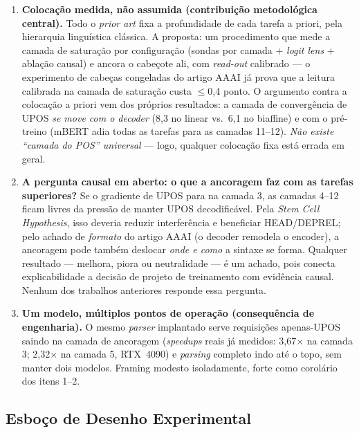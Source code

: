\begin{enumerate}
  \item \textbf{Colocação medida, não assumida (contribuição metodológica central).} Todo o
        \textit{prior art} fixa a profundidade de cada tarefa a priori, pela hierarquia
        linguística clássica. A proposta: um procedimento que mede a camada de saturação por
        configuração (sondas por camada + \textit{logit lens} + ablação causal) e ancora o
        cabeçote ali, com \textit{read-out} calibrado --- o experimento de cabeças congeladas
        do artigo AAAI já prova que a leitura calibrada na camada de saturação custa
        $\leq$0,4 ponto. O argumento contra a colocação a priori vem dos próprios resultados:
        a camada de convergência de UPOS \emph{se move com o decoder} (8,3 no linear vs.\ 6,1
        no biaffine) e com o pré-treino (mBERT adia todas as tarefas para as camadas 11--12).
        \emph{Não existe ``camada do POS'' universal} --- logo, qualquer colocação fixa está
        errada em geral.
  \item \textbf{A pergunta causal em aberto: o que a ancoragem faz com as tarefas superiores?}
        Se o gradiente de UPOS para na camada 3, as camadas 4--12 ficam livres da pressão de
        manter UPOS decodificável. Pela \textit{Stem Cell Hypothesis}, isso deveria reduzir
        interferência e beneficiar HEAD/DEPREL; pelo achado de \emph{formato} do artigo AAAI
        (o decoder remodela o encoder), a ancoragem pode também deslocar \emph{onde e como} a
        sintaxe se forma. Qualquer resultado --- melhora, piora ou neutralidade --- é um
        achado, pois conecta explicabilidade a decisão de projeto de treinamento com evidência
        causal. Nenhum dos trabalhos anteriores responde essa pergunta.
  \item \textbf{Um modelo, múltiplos pontos de operação (consequência de engenharia).} O mesmo
        \textit{parser} implantado serve requisições apenas-UPOS saindo na camada de ancoragem
        (\textit{speedups} reais já medidos: 3,67$\times$ na camada 3; 2,32$\times$ na camada
        5, RTX~4090) e \textit{parsing} completo indo até o topo, sem manter dois modelos.
        Framing modesto isoladamente, forte como corolário dos itens 1--2.
\end{enumerate}

\subsection{Esboço de Desenho Experimental}
\label{subsec:proposta_experimentos}


